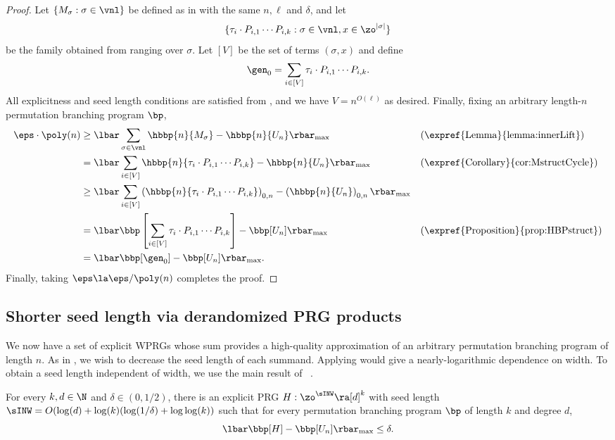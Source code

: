 \documentclass{toc}
\begin{document}
\cycleRichardson*
\begin{proof}
Let $\{M_\sigma:\sigma \in \vnl\}$ be defined as in  with the same $n,\ell$ and $\delta$, and let 
$$\{\tau_{i}\cdot P_{i,1}\cdots P_{i,k}:\sigma\in \vnl,x\in \zo^{|\sigma|}\}$$ 
be the family obtained from  ranging over $\sigma$. Let $[V]$ be the set of terms $(\sigma,x)$ and define
\[\gen_0=\sum_{i\in[V]}\tau_{i}\cdot P_{i,1}\cdots P_{i,k}.\]
All explicitness and seed length conditions are satisfied from , and we have $V=n^{O(\ell)}$ as desired.
Finally, fixing an arbitrary length-$n$ permutation branching program $\bp$,
\begin{align*}
    \eps\cdot\poly(n) &\geq \lbar\sum_{\sigma \in \vnl} \hbbp{n}{M_\sigma}-\hbbp{n}{U_n}\rbar_{\max} && \text{(\expref{Lemma}{lemma:innerLift})}\\
    &= \lbar\sum_{i\in[V]} \hbbp{n}{\tau_{i}\cdot P_{i,1}\cdots P_{i,k}}-\hbbp{n}{U_n}\rbar_{\max} && \text{(\expref{Corollary}{cor:MstructCycle})}\\
    &\geq \lbar\sum_{i\in[V]}  \left(\hbbp{n}{\tau_{i}\cdot P_{i,1}\cdots P_{i,k}}\right)_{0,n}-\left(\hbbp{n}{U_n}\right)_{0,n}\rbar_{\max}\\
    &= \lbar\bbp\left[\sum_{i\in[V]}\tau_{i}\cdot P_{i,1}\cdots P_{i,k}\right]-\bbp[U_n]\rbar_{\max} && \text{(\expref{Proposition}{prop:HBPstruct})}\\
    &= \lbar \bbp[\gen_0] -\bbp[U_n]\rbar_{\max}.
\end{align*}
Finally, taking $\eps\la \eps/\poly(n)$ completes the proof.
\end{proof}

\subsection{Shorter seed length via derandomized PRG products}
We now have a set of explicit WPRGs whose sum provides a %
high-quality %
approximation of an arbitrary permutation branching program of length $n$. As in , we wish to decrease the seed length of each summand. Applying  would give a nearly-logarithmic dependence on width. To obtain a seed length independent of width, we use the main result of ~\cite{HozaPyVa21}. 

\begin{theorem}\label{thm:HPVinner}
For every $k,d\in \N$ and $\delta\in(0,1/2)$, there is an explicit PRG $H:\zo^{\sINW}\ra [d]^k$ with seed length $\sINW=O(\log(d)+\log(k)(\log(1/\delta)+\log\log(k))$ such that for every permutation branching program $\bp$ of length $k$ and degree $d$,
$$\lbar \bbp[H]-\bbp[U_n]\rbar_{\max}\leq \delta.$$
\end{theorem}
\end{document}
